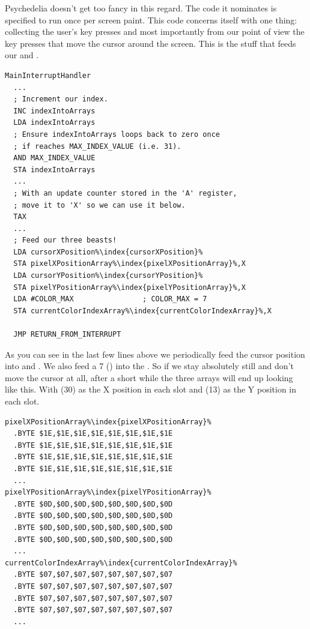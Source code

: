 Psychedelia doesn't get too fancy in this regard. The code it nominates is specified to run once per screen paint. This code concerns itself
with one thing: collecting the user's key presses and most importantly from our point of view the key presses that move the cursor around
the screen. This is the stuff that feeds our  and .

\begin{lstlisting}[escapechar=\%]
MainInterruptHandler   
  ...
  ; Increment our index.
  INC indexIntoArrays
  LDA indexIntoArrays
  ; Ensure indexIntoArrays loops back to zero once
  ; if reaches MAX_INDEX_VALUE (i.e. 31).
  AND MAX_INDEX_VALUE
  STA indexIntoArrays
  ...
  ; With an update counter stored in the 'A' register,
  ; move it to 'X' so we can use it below.
  TAX
  ...
  ; Feed our three beasts!
  LDA cursorXPosition%\index{cursorXPosition}%
  STA pixelXPositionArray%\index{pixelXPositionArray}%,X
  LDA cursorYPosition%\index{cursorYPosition}%
  STA pixelYPositionArray%\index{pixelYPositionArray}%,X
  LDA #COLOR_MAX                ; COLOR_MAX = 7
  STA currentColorIndexArray%\index{currentColorIndexArray}%,X

  JMP RETURN_FROM_INTERRUPT
\end{lstlisting}

As you can see in the last few lines above we periodically feed the cursor position into  and .
We also feed a 7 () into the . So if we stay absolutely still and don't move the cursor at all, after
a short while the three arrays will end up looking like this. With  (30) as the X position in each slot and  (13) as the Y
position in each slot.

\begin{lstlisting}[escapechar=\%]
pixelXPositionArray%\index{pixelXPositionArray}%   
  .BYTE $1E,$1E,$1E,$1E,$1E,$1E,$1E,$1E
  .BYTE $1E,$1E,$1E,$1E,$1E,$1E,$1E,$1E
  .BYTE $1E,$1E,$1E,$1E,$1E,$1E,$1E,$1E
  .BYTE $1E,$1E,$1E,$1E,$1E,$1E,$1E,$1E
  ...
pixelYPositionArray%\index{pixelYPositionArray}%   
  .BYTE $0D,$0D,$0D,$0D,$0D,$0D,$0D,$0D
  .BYTE $0D,$0D,$0D,$0D,$0D,$0D,$0D,$0D
  .BYTE $0D,$0D,$0D,$0D,$0D,$0D,$0D,$0D
  .BYTE $0D,$0D,$0D,$0D,$0D,$0D,$0D,$0D
  ...
currentColorIndexArray%\index{currentColorIndexArray}%   
  .BYTE $07,$07,$07,$07,$07,$07,$07,$07
  .BYTE $07,$07,$07,$07,$07,$07,$07,$07
  .BYTE $07,$07,$07,$07,$07,$07,$07,$07
  .BYTE $07,$07,$07,$07,$07,$07,$07,$07
  ...
\end{lstlisting}

